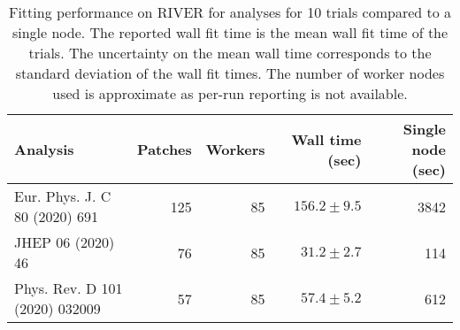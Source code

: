 \begin{table}[htpb]
\centering
\caption{Fitting performance on RIVER for analyses for 10 trials compared to a single node. The reported wall fit time is the mean wall fit time of the trials. The uncertainty on the mean wall time corresponds to the standard deviation of the wall fit times. The number of worker nodes used is approximate as per-run reporting is not available.}
\label{table:performance}
\begin{tabular}{@{}lrrrr@{}}
\toprule
                      Analysis & Patches & Workers & Wall time (sec) & Single node (sec) \\
\midrule
 Eur. Phys. J. C 80 (2020) 691 &     125 &      85 &   $156.2\pm9.5$ &              3842 \\
             JHEP 06 (2020) 46 &      76 &      85 &    $31.2\pm2.7$ &               114 \\
Phys. Rev. D 101 (2020) 032009 &      57 &      85 &    $57.4\pm5.2$ &               612 \\
\bottomrule
\end{tabular}
\end{table}
